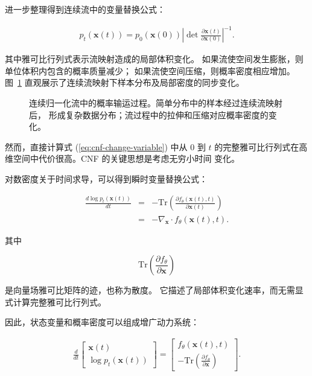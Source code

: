 进一步整理得到连续流中的变量替换公式：

\begin{eqnarray}
p_t(\mathbf{x}(t))
=
p_0(\mathbf{x}(0))
\left|
\det
\frac{\partial\mathbf{x}(t)}
{\partial\mathbf{x}(0)}
\right|^{-1}.
\label{eq:cnf-change-variable}
\end{eqnarray}

其中雅可比行列式表示流映射造成的局部体积变化。
如果流使空间发生膨胀，则单位体积内包含的概率质量减少；
如果流使空间压缩，则概率密度相应增加。图~\ref{fig:cnf-example}
直观展示了连续流映射下样本分布及局部密度的同步变化。

\begin{figure}[!t]
\centering
{}
\caption{连续归一化流中的概率输运过程。简单分布中的样本经过连续流映射后，
形成复杂数据分布；流过程中的拉伸和压缩对应概率密度的变化。}
\label{fig:cnf-example}
\end{figure}


然而，直接计算式 (\ref{eq:cnf-change-variable}) 中从 $0$ 到 $t$
的完整雅可比行列式在高维空间中代价很高。CNF 的关键思想是考虑无穷小时间
变化。

对数密度关于时间求导，可以得到瞬时变量替换公式：

\begin{eqnarray}
\frac{d\log p_t(\mathbf{x}(t))}{dt}
&=&
-\mathrm{Tr}
\left(
\frac{\partial f_{\theta}(\mathbf{x}(t),t)}
{\partial\mathbf{x}(t)}
\right)
\nonumber\\
&=&
-\nabla_{\mathbf{x}}\cdot f_{\theta}(\mathbf{x}(t),t).
\label{eq:cnf-instantaneous}
\end{eqnarray}

其中

\[
\mathrm{Tr}
\left(
\frac{\partial f_{\theta}}
{\partial\mathbf{x}}
\right)
\]

是向量场雅可比矩阵的迹，也称为散度。
它描述了局部体积变化速率，而无需显式计算完整雅可比行列式。

因此，状态变量和概率密度可以组成增广动力系统：

\begin{eqnarray}
\frac{d}{dt}
\begin{bmatrix}
\mathbf{x}(t)\\
\log p_t(\mathbf{x}(t))
\end{bmatrix}
=
\begin{bmatrix}
f_{\theta}(\mathbf{x}(t),t)
\\
-\mathrm{Tr}
(
\frac{\partial f_{\theta}}
{\partial\mathbf{x}}
)
\end{bmatrix}.
\label{eq:cnf-augmented}
\end{eqnarray}

